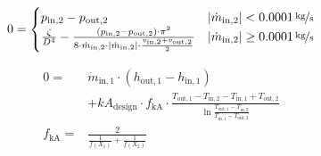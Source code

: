 \documentclass[]{article}
\begin{document}
\begin{equation}
\label{eq:HeatExchanger_zeta2}
0 = \begin{cases}
p_\mathrm{in,2}- p_\mathrm{out,2} & |\dot{m}_\mathrm{in,2}| < \unitfrac[0.0001]{kg}{s} \\
\frac{\zeta}{D^4}-\frac{(p_\mathrm{in,2}-p_\mathrm{out,2})\cdot\pi^2}{8\cdot\dot{m}_\mathrm{in,2}\cdot|\dot{m}_\mathrm{in,2}|\cdot\frac{v_\mathrm{in,2} + v_\mathrm{out,2}}{2}}& |\dot{m}_\mathrm{in,2}| \geq \unitfrac[0.0001]{kg}{s}
\end{cases}
\end{equation}

\begin{equation}
\label{eq:HeatExchanger_kA_char}
\begin{split}
0 = & \dot{m}_\mathrm{in,1} \cdot \left( h_\mathrm{out,1} - h_\mathrm{in,1}\right)\\
&+kA_\mathrm{design} \cdot f_\mathrm{kA} \cdot \frac{T_\mathrm{out,1} - T_\mathrm{in,2} - T_\mathrm{in,1} + T_\mathrm{out,2}}{\ln{\frac{T_\mathrm{out,1} - T_\mathrm{in,2}}{T_\mathrm{in,1} - T_\mathrm{out,2}}}}\\
f_\mathrm{kA}=&\frac{2}{\frac{1}{f\left(X_1\right)}+\frac{1}{f\left(X_2\right)}}\\
\end{split}
\end{equation}
\end{document}
